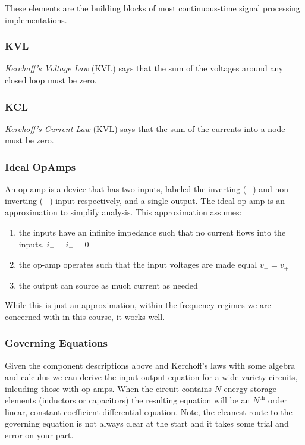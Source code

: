 These elements are the building blocks of most continuous-time signal processing implementations.

\subsubsection*{KVL}

\textit{Kerchoff's Voltage Law} (KVL) says that the sum of the voltages around any closed loop must be zero.

\subsubsection*{KCL}

\textit{Kerchoff's Current Law} (KVL) says that the sum of the currents into a node must be zero.

\subsubsection*{Ideal OpAmps}

An op-amp is a device that has two inputs, labeled the inverting ($-$) and non-inverting ($+$) input respectively, and a single output. The ideal op-amp is an approximation to simplify analysis. This approximation assumes:

\begin{enumerate}
\item the inputs have an infinite impedance such that no current flows into the inputs, $i_+ = i_- = 0$
\item the op-amp operates such that the input voltages are made equal $v_- = v_+$
\item the output can source as much current as needed
\end{enumerate}
 
While this is just an approximation, within the frequency regimes we are concerned with in this course, it works well. 

\subsubsection*{Governing Equations}

Given the component descriptions above and Kerchoff's laws with some algebra and calculus we can derive the input output equation for a wide variety circuits, inlcuding those with op-amps. When the circuit contains $N$ energy storage elements (inductors or capacitors) the resulting equation will be an $N^\text{th}$ order linear, constant-coefficient differential equation. Note, the cleanest route to the governing equation is not always clear at the start and it takes some trial and error on your part.

